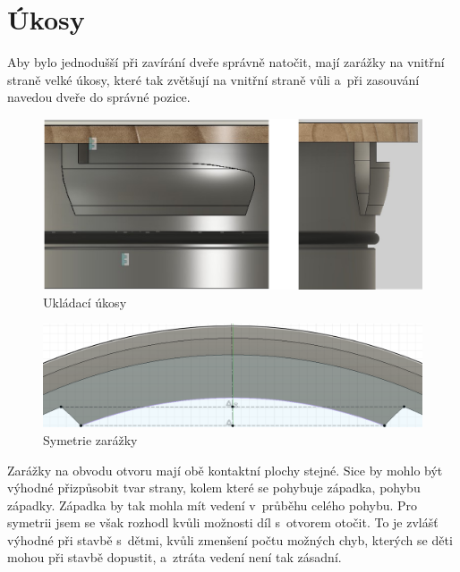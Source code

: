 {\tiny }\section{Úkosy}

Aby bylo jednodušší při zavírání dveře správně natočit, 
mají zarážky na vnitřní straně velké úkosy, které tak zvětšují na vnitřní straně 
vůli a~při zasouvání navedou dveře do správné pozice.

\begin{figure}[h]  
    \centering
    \includegraphics[width=1\textwidth]{kapitoly/obrazky/E4/ukozy/ukladaci_ukosy.png}
    \caption{Ukládací úkosy}
    \label{fig:E4-ukosy}
\end{figure}
\begin{figure}[h]
    \centering
    \includegraphics[width=1\textwidth]{kapitoly/obrazky/E4/ukozy/simetrie_zarazek.png}
    \caption{Symetrie zarážky}
    \label{fig:E4-simetrie_zarazky}
\end{figure}
\enlargethispage{5mm}
Zarážky na obvodu otvoru mají obě kontaktní plochy stejné. Sice by mohlo být výhodné přizpůsobit tvar strany, 
kolem které se pohybuje západka, 
pohybu západky. Západka by tak mohla mít vedení v~průběhu celého pohybu. 
Pro symetrii jsem se však rozhodl kvůli možnosti díl s~otvorem otočit.
To je zvlášť výhodné při stavbě s~dětmi, kvůli zmenšení počtu možných chyb, 
kterých se děti mohou při stavbě dopustit, a~ztráta vedení není tak zásadní.